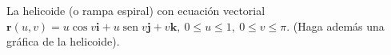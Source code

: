 \item La helicoide (o rampa espiral) con ecuación vectorial $\mathbf{r}(u, v) = u \cos v \mathbf{i} + u \operatorname{sen} v \mathbf{j} + v \mathbf{k}, \ 0 \le u \le 1, \ 0 \le v \le \pi$. (Haga además una gráfica de la helicoide).

